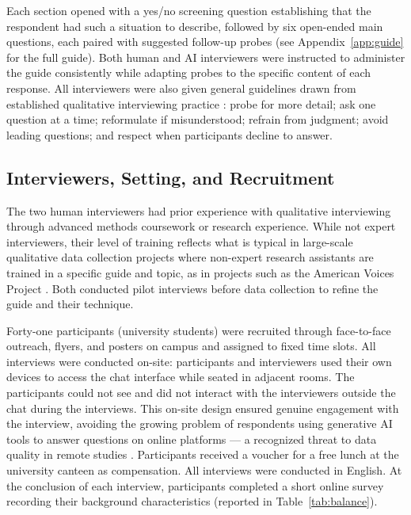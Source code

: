 \documentclass[12pt]{article}
\begin{document}
Each section opened with a yes/no screening question establishing that the respondent had such a situation to describe, followed by six open-ended main questions, each paired with suggested follow-up probes (see Appendix~\ref{app:guide} for the full guide). Both human and AI interviewers were instructed to administer the guide consistently while adapting probes to the specific content of each response. All interviewers were also given general guidelines drawn from established qualitative interviewing practice \citep{Lareau2021, Gerson2020, Weiss1995}: probe for more detail; ask one question at a time; reformulate if misunderstood; refrain from judgment; avoid leading questions; and respect when participants decline to answer.

\subsection*{Interviewers, Setting, and Recruitment}

The two human interviewers had prior experience with qualitative interviewing through advanced methods coursework or research experience. While not expert interviewers, their level of training reflects what is typical in large-scale qualitative data collection projects where non-expert research assistants are trained in a specific guide and topic, as in projects such as the American Voices Project \citep{EdinFieldsEtAl_2024_Listening_to_Voices_of_America}. Both conducted pilot interviews before data collection to refine the guide and their technique.

Forty-one participants (university students) were recruited through face-to-face outreach, flyers, and posters on campus and assigned to fixed time slots. All interviews were conducted on-site: participants and interviewers used their own devices to access the chat interface while seated in adjacent rooms. The participants could not see and did not interact with the interviewers outside the chat during the interviews. This on-site design ensured genuine engagement with the interview, avoiding the growing problem of respondents using generative AI tools to answer questions on online platforms --- a recognized threat to data quality in remote studies \citep{ZhangXuEtAl_2025_Generative_AI_Meets_Open-Ended_Survey_Responses_Research_Participant_Use_of_AI_and_Homogenization}. Participants received a voucher for a free lunch at the university canteen as compensation. All interviews were conducted in English. At the conclusion of each interview, participants completed a short online survey recording their background characteristics (reported in Table~\ref{tab:balance}).
\end{document}
